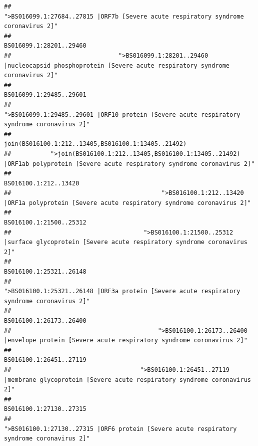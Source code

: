 \documentclass[
]{article}
\begin{document}
\begin{verbatim}
##                                                    ">BS016099.1:27684..27815 |ORF7b [Severe acute respiratory syndrome coronavirus 2]" 
##                                                                                                                BS016099.1:28201..29460 
##                              ">BS016099.1:28201..29460 |nucleocapsid phosphoprotein [Severe acute respiratory syndrome coronavirus 2]" 
##                                                                                                                BS016099.1:29485..29601 
##                                            ">BS016099.1:29485..29601 |ORF10 protein [Severe acute respiratory syndrome coronavirus 2]" 
##                                                                                    join(BS016100.1:212..13405,BS016100.1:13405..21492) 
##           ">join(BS016100.1:212..13405,BS016100.1:13405..21492) |ORF1ab polyprotein [Severe acute respiratory syndrome coronavirus 2]" 
##                                                                                                                  BS016100.1:212..13420 
##                                          ">BS016100.1:212..13420 |ORF1a polyprotein [Severe acute respiratory syndrome coronavirus 2]" 
##                                                                                                                BS016100.1:21500..25312 
##                                     ">BS016100.1:21500..25312 |surface glycoprotein [Severe acute respiratory syndrome coronavirus 2]" 
##                                                                                                                BS016100.1:25321..26148 
##                                            ">BS016100.1:25321..26148 |ORF3a protein [Severe acute respiratory syndrome coronavirus 2]" 
##                                                                                                                BS016100.1:26173..26400 
##                                         ">BS016100.1:26173..26400 |envelope protein [Severe acute respiratory syndrome coronavirus 2]" 
##                                                                                                                BS016100.1:26451..27119 
##                                    ">BS016100.1:26451..27119 |membrane glycoprotein [Severe acute respiratory syndrome coronavirus 2]" 
##                                                                                                                BS016100.1:27130..27315 
##                                             ">BS016100.1:27130..27315 |ORF6 protein [Severe acute respiratory syndrome coronavirus 2]" 

\end{verbatim}
\end{document}
